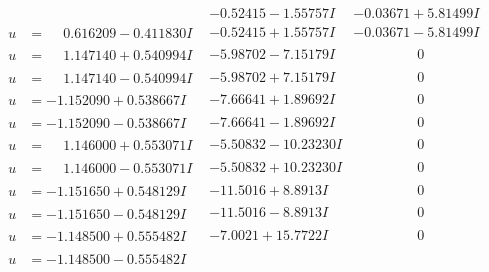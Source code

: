 \documentclass[1p]{elsarticle_modified}
\theoremstyle{definition}
\begin{document}
$$\begin{array}{c|c|c}
 & -0.52415 - 1.55757 I & -0.03671 + 5.81499 I \\ \hline\begin{aligned}
u &= \phantom{-}0.616209 - 0.411830 I\end{aligned}
 & -0.52415 + 1.55757 I & -0.03671 - 5.81499 I \\ \hline\begin{aligned}
u &= \phantom{-}1.147140 + 0.540994 I\end{aligned}
 & -5.98702 - 7.15179 I & \phantom{-0.000000 } 0 \\ \hline\begin{aligned}
u &= \phantom{-}1.147140 - 0.540994 I\end{aligned}
 & -5.98702 + 7.15179 I & \phantom{-0.000000 } 0 \\ \hline\begin{aligned}
u &= -1.152090 + 0.538667 I\end{aligned}
 & -7.66641 + 1.89692 I & \phantom{-0.000000 } 0 \\ \hline\begin{aligned}
u &= -1.152090 - 0.538667 I\end{aligned}
 & -7.66641 - 1.89692 I & \phantom{-0.000000 } 0 \\ \hline\begin{aligned}
u &= \phantom{-}1.146000 + 0.553071 I\end{aligned}
 & -5.50832 - 10.23230 I & \phantom{-0.000000 } 0 \\ \hline\begin{aligned}
u &= \phantom{-}1.146000 - 0.553071 I\end{aligned}
 & -5.50832 + 10.23230 I & \phantom{-0.000000 } 0 \\ \hline\begin{aligned}
u &= -1.151650 + 0.548129 I\end{aligned}
 & -11.5016 + 8.8913 I & \phantom{-0.000000 } 0 \\ \hline\begin{aligned}
u &= -1.151650 - 0.548129 I\end{aligned}
 & -11.5016 - 8.8913 I & \phantom{-0.000000 } 0 \\ \hline\begin{aligned}
u &= -1.148500 + 0.555482 I\end{aligned}
 & -7.0021 + 15.7722 I & \phantom{-0.000000 } 0 \\ \hline\begin{aligned}
u &= -1.148500 - 0.555482 I\end{aligned}

\end{array}$$
\end{document}
